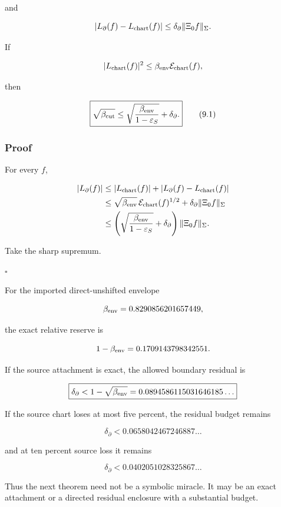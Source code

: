 and

\[
|L_\partial(f)-L_{\rm chart}(f)|
\le
\delta_\partial\|\Xi_0f\|_\Sigma.
\]

If

\[
|L_{\rm chart}(f)|^2
\le
\beta_{\rm env}\mathcal E_{\rm chart}(f),
\]

then

\[
\boxed{
\sqrt{\beta_{\rm cut}}
\le
\sqrt{\frac{\beta_{\rm env}}{1-\varepsilon_S}}
+
\delta_\partial.
}
\tag{9.1}
\]

\hypertarget{proof-3}{%
\subsubsection{Proof}\label{proof-3}}

For every \(f\),

\[
\begin{aligned}
|L_\partial(f)|
&\le
|L_{\rm chart}(f)|
+
|L_\partial(f)-L_{\rm chart}(f)|\\
&\le
\sqrt{\beta_{\rm env}}\,
\mathcal E_{\rm chart}(f)^{1/2}
+
\delta_\partial\|\Xi_0f\|_\Sigma\\
&\le
\left(
\sqrt{\frac{\beta_{\rm env}}{1-\varepsilon_S}}
+
\delta_\partial
\right)
\|\Xi_0f\|_\Sigma.
\end{aligned}
\]

Take the sharp supremum.

\(\square\)

For the imported direct-unshifted envelope

\[
\beta_{\rm env}
=
0.8290856201657449,
\]

the exact relative reserve is

\[
1-\beta_{\rm env}
=
0.1709143798342551.
\]

If the source attachment is exact, the allowed boundary residual is

\[
\boxed{
\delta_\partial
<
1-\sqrt{\beta_{\rm env}}
=
0.0894586115031646185\ldots
}
\]

If the source chart loses at most five percent, the residual budget remains

\[
\delta_\partial
<
0.0658042467246887\ldots
\]

and at ten percent source loss it remains

\[
\delta_\partial
<
0.0402051028325867\ldots
\]

Thus the next theorem need not be a symbolic miracle. It may be an exact
attachment or a directed residual enclosure with a substantial budget.

